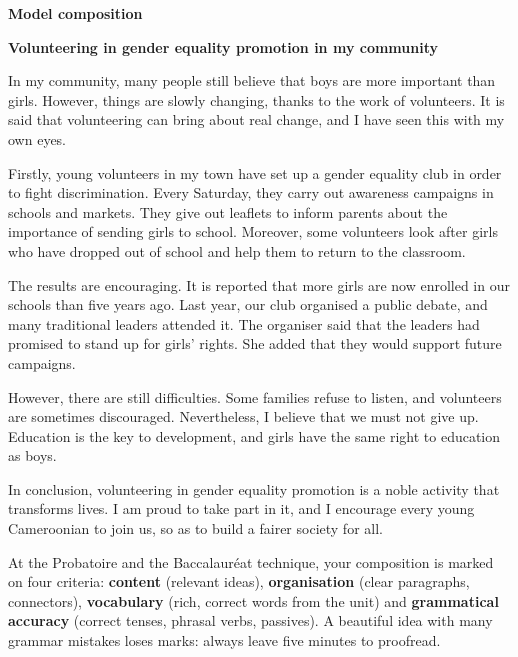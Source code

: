 \documentclass[11pt]{article}
\begin{document}
\textbf{Model composition}\par

\begin{exemplebox}
\textbf{Volunteering in gender equality promotion in my community}

In my community, many people still believe that boys are more important than girls. However, things are slowly changing, thanks to the work of volunteers. It is said that volunteering can bring about real change, and I have seen this with my own eyes.

Firstly, young volunteers in my town have set up a gender equality club in order to fight discrimination. Every Saturday, they carry out awareness campaigns in schools and markets. They give out leaflets to inform parents about the importance of sending girls to school. Moreover, some volunteers look after girls who have dropped out of school and help them to return to the classroom.

The results are encouraging. It is reported that more girls are now enrolled in our schools than five years ago. Last year, our club organised a public debate, and many traditional leaders attended it. The organiser said that the leaders had promised to stand up for girls' rights. She added that they would support future campaigns.

However, there are still difficulties. Some families refuse to listen, and volunteers are sometimes discouraged. Nevertheless, I believe that we must not give up. Education is the key to development, and girls have the same right to education as boys.

In conclusion, volunteering in gender equality promotion is a noble activity that transforms lives. I am proud to take part in it, and I encourage every young Cameroonian to join us, so as to build a fairer society for all.
\end{exemplebox}

\begin{attention}
At the Probatoire and the Baccalauréat technique, your composition is marked on four criteria: \textbf{content} (relevant ideas), \textbf{organisation} (clear paragraphs, connectors), \textbf{vocabulary} (rich, correct words from the unit) and \textbf{grammatical accuracy} (correct tenses, phrasal verbs, passives). A beautiful idea with many grammar mistakes loses marks: always leave five minutes to proofread.
\end{attention}
\end{document}
